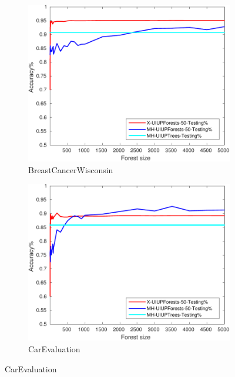 \begin{figure}[ht]
	\centering

  \begin{subfigure}[b]{0.3\textwidth}
		\centering
		\includegraphics[width=\textwidth]{figs/PLPTF/Forests/BreastCancerWisconsinDownsampled_Forests_X_MH.pdf}
		\caption{BreastCancerWisconsin}
		\label{fig:B3}
	\end{subfigure}
  \begin{subfigure}[b]{0.3\textwidth}
		\centering
  	\includegraphics[width=\textwidth]{figs/PLPTF/Forests/CarEvaluation_Forests_X_MH.pdf}
  	\caption{CarEvaluation}
		\label{fig:Car3}
	\end{subfigure}

\end{figure}
